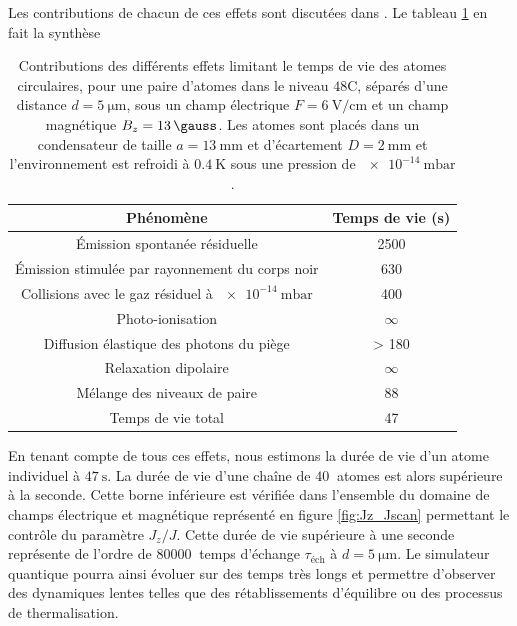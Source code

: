 Les contributions de chacun de ces effets sont discutées dans \cite{ENS_PRE_CIRCSIM}.
Le tableau \ref{tab:lifetime_circsim} en fait la synthèse
%
\begin{table}[!h]
	\centering
	\caption[Contributions des différents effets limitant le temps de vie des atomes circulaires]{Contributions des différents effets limitant le temps de vie des atomes circulaires, pour une paire d'atomes dans le niveau $\mathrm{48C}$, séparés d'une distance $d=\SI{5}{\um}$, sous un champ électrique $F=\SI{6}{\V/\cm}$ et un champ magnétique $B_z=\SI{13}{\gauss}$.
	Les atomes sont placés dans un condensateur de taille $a=\SI{13}{\mm}$ et d'écartement $D=\SI{2}{\mm}$ et l'environnement est refroidi à $\SI{0.4}{\K}$ sous une pression de $\SI{e-14}{\milli\bar}$.
	}
	\label{tab:lifetime_circsim}
	\begin{tabular}{c c}
		\toprule\midrule
		Phénomène
		& Temps de vie (\si{\second})\\
		\midrule
		Émission spontanée résiduelle & \SI{2500}{} \\
		Émission stimulée par rayonnement du corps noir & \SI{630}{} \\
		Collisions avec le gaz résiduel à $\SI{e-14}{\milli\bar}$ & \SI{400}{} \\
		Photo-ionisation & $\infty$ \\
		Diffusion élastique des photons du piège & \SI{> 180}{} \\
		Relaxation dipolaire & $\infty$ \\
		Mélange des niveaux de paire & \SI{88}{} \\
		\midrule \midrule
		Temps de vie total & 47 \\
		\midrule \bottomrule
 	\end{tabular}
\end{table}
%
En tenant compte de tous ces effets, nous estimons la durée de vie d'un atome individuel à $\SI{47}{\second}$.
La durée de vie d'une chaîne de $\SI{40}{}$ atomes est alors supérieure à la seconde.
Cette borne inférieure est vérifiée dans l'ensemble du domaine de champs électrique et magnétique représenté en figure \ref{fig:Jz_Jscan} permettant le contrôle du paramètre $J_z/J$.
Cette durée de vie supérieure à une seconde représente de l'ordre de $\SI{80000}{}$ temps d'échange $\tau_{\text{éch}}$ à $d=\SI{5}{\um}$.
Le simulateur quantique pourra ainsi évoluer sur des temps très longs et permettre d'observer des dynamiques lentes telles que des rétablissements d'équilibre ou des processus de thermalisation.


